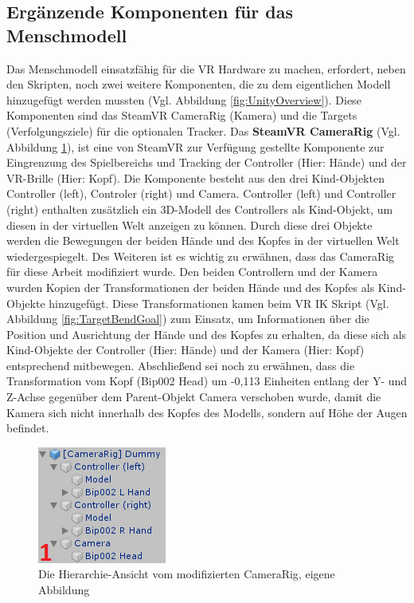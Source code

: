\subsection{Ergänzende Komponenten für das Menschmodell}\label{sec:MMKomponenten}
Das Menschmodell einsatzfähig für die VR Hardware zu machen, erfordert, neben den Skripten, noch zwei weitere Komponenten, die zu dem eigentlichen Modell hinzugefügt werden mussten (Vgl. Abbildung \ref{fig:UnityOverview}). Diese Komponenten sind das SteamVR CameraRig (Kamera) und die Targets (Verfolgungsziele) für die optionalen Tracker.
\newline\newline
Das \textbf{SteamVR CameraRig} (Vgl. Abbildung \ref{fig:CameraRig}), ist eine von SteamVR zur Verfügung gestellte Komponente zur Eingrenzung des Spielbereichs und Tracking der Controller (Hier: Hände) und der VR-Brille (Hier: Kopf). Die Komponente besteht aus den drei Kind-Objekten Controller (left), Controler (right) und Camera. Controller (left) und Controller (right) enthalten zusätzlich ein 3D-Modell des Controllers als Kind-Objekt, um diesen in der virtuellen Welt anzeigen zu können. Durch diese drei Objekte werden die Bewegungen der beiden Hände und des Kopfes in der virtuellen Welt wiedergespiegelt. Des Weiteren ist es wichtig zu erwähnen, dass das CameraRig für diese Arbeit modifiziert wurde. Den beiden Controllern und der Kamera wurden Kopien der Transformationen der beiden Hände und des Kopfes als Kind-Objekte hinzugefügt. Diese Transformationen kamen beim VR IK Skript (Vgl. Abbildung \ref{fig:TargetBendGoal}) zum Einsatz, um Informationen über die Position und Ausrichtung der Hände und des Kopfes zu erhalten, da diese sich als Kind-Objekte der Controller (Hier: Hände) und der Kamera (Hier: Kopf) entsprechend mitbewegen. Abschließend sei noch zu erwähnen, dass die Transformation vom Kopf (Bip002 Head) um -0,113 Einheiten entlang der Y- und Z-Achse gegenüber dem Parent-Objekt Camera verschoben wurde, damit die Kamera sich nicht innerhalb des Kopfes des Modells, sondern auf Höhe der Augen befindet.
\begin{figure}[h]
	\centering
	\includegraphics[width=0.25\linewidth]{Bilder/A37_CameraRig2}
	\caption{Die Hierarchie-Ansicht vom modifizierten CameraRig, eigene Abbildung}
	\label{fig:CameraRig}
\end{figure}
